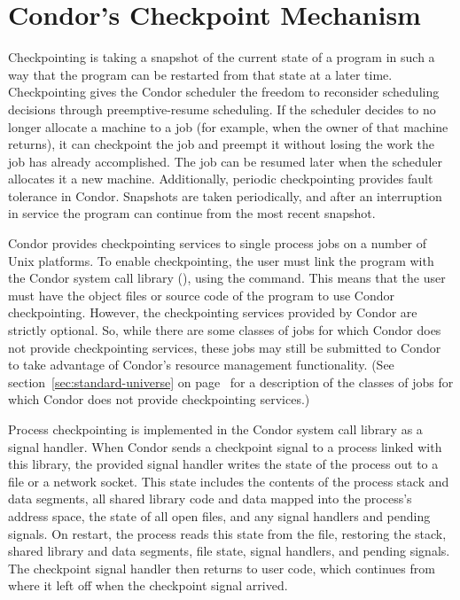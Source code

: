 \section{\label{ckpt-reference}
Condor's Checkpoint Mechanism}

Checkpointing is taking a snapshot of the current state of a program
in such a way that the program can be restarted from that state at a
later time.  Checkpointing gives the Condor scheduler the freedom to
reconsider scheduling decisions through preemptive-resume scheduling.
If the scheduler decides to no longer allocate a machine to a job (for
example, when the owner of that machine returns), it can checkpoint
the job and preempt it without losing the work the job has already
accomplished.  The job can be resumed later when the scheduler
allocates it a new machine.  Additionally, periodic checkpointing
provides fault tolerance in Condor.  Snapshots are taken periodically,
and after an interruption in service the program can continue from the
most recent snapshot.

Condor provides checkpointing services to single process jobs on a
number of Unix platforms.
To enable checkpointing, the user must link the program with the
Condor system call library (), using the
 command.
This means that the
user must have the object files or source code of the program to use
Condor checkpointing.  However, the checkpointing services provided by
Condor are strictly optional.  So, while there are some classes of
jobs for which Condor does not provide checkpointing services, these
jobs may still be submitted to Condor to take advantage of Condor's
resource management functionality.  (See
section~\ref{sec:standard-universe} on
page~\pageref{sec:standard-universe} for a description of the
classes of jobs for which Condor does not provide checkpointing
services.)

Process checkpointing is implemented in the Condor system call library
as a signal handler.  When Condor sends a checkpoint signal to a
process linked with this library, the provided signal handler writes
the state of the process out to a file or a network socket.  This
state includes the contents of the process stack and data segments,
all shared library code and data mapped into the process's address
space, the state of all open files, and any signal handlers and
pending signals.  On restart, the process reads this state from the
file, restoring the stack, shared library and data segments, file
state, signal handlers, and pending signals.  The checkpoint signal
handler then returns to user code, which continues from where it left
off when the checkpoint signal arrived.

